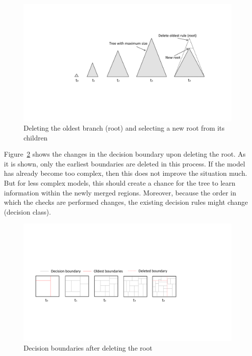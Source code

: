 \begin{figure}[htbp]
    \begin{center}
        \includegraphics[width=14.0cm]{figs/deleteroot.pdf}
        \caption{Deleting the oldest branch (root) and selecting a new root from its children}
        \label{fig:algo:delroot}
    \end{center}
\end{figure}

Figure~\ref{fig:algo:delrootdb} shows the changes in the decision boundary upon deleting the root. As it is shown, only the earliest boundaries are deleted in this process. If the model has already become too complex, then this does not improve the situation much. But for less complex models, this should create a chance for the tree to learn information within the newly merged regions. Moreover, because the order in which the checks are performed changes, the existing decision rules might change (decision class).

\begin{figure}[htbp]
    \begin{center}
        \includegraphics[width=14.0cm]{figs/deleterootdb.pdf}
        \caption{Decision boundaries after deleting the root}
        \label{fig:algo:delrootdb}
    \end{center}
\end{figure}


